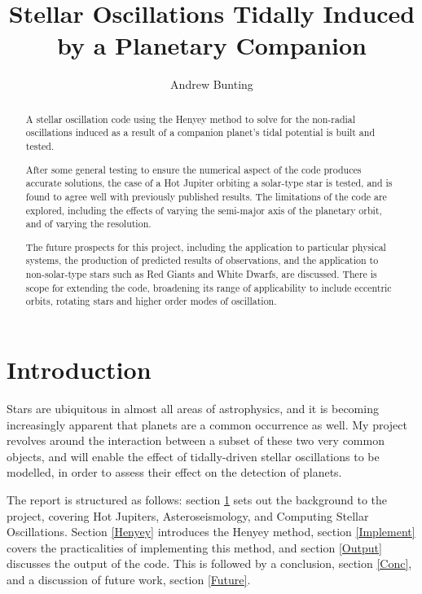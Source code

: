 \documentclass[11pt]{amsart}
\title{Stellar Oscillations Tidally Induced by a Planetary Companion}
\author{Andrew Bunting}
\begin{document}
\maketitle


\begin{abstract}

A stellar oscillation code using the Henyey method to solve for the non-radial oscillations induced as a result of a companion planet's tidal potential is built and tested.

After some general testing to ensure the numerical aspect of the code produces accurate solutions, the case of a Hot Jupiter orbiting a solar-type star is tested, and is found to agree well with previously published results.  The limitations of the code are explored, including the effects of varying the semi-major axis of the planetary orbit, and of varying the resolution.

The future prospects for this project, including the application to particular physical systems, the production of predicted results of observations, and the application to non-solar-type stars such as Red Giants and White Dwarfs, are discussed.  There is scope for extending the code, broadening its range of applicability to include eccentric orbits, rotating stars and higher order modes of oscillation.

\end{abstract}


\section{Introduction} \label{Introduction}

Stars are ubiquitous in almost all areas of astrophysics, and it is becoming increasingly apparent that planets are a common occurrence as well.  My project revolves around the interaction between a subset of these two very common objects, and will enable the effect of tidally-driven stellar oscillations to be modelled, in order to assess their effect on the detection of planets.

The report is structured as follows: section \ref{Introduction} sets out the background to the project, covering Hot Jupiters, Asteroseismology, and Computing Stellar Oscillations.  Section \ref{Henyey} introduces the Henyey method, section \ref{Implement} covers the practicalities of implementing this method, and section \ref{Output} discusses the output of the code.  This is followed by a conclusion, section \ref{Conc}, and a discussion of future work, section \ref{Future}.
\end{document}
